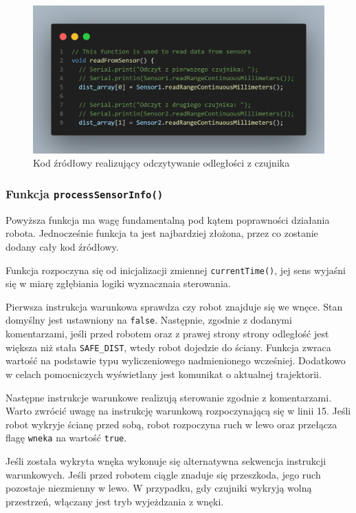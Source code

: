 \documentclass{report}
\begin{document}
\begin{figure}[H]
    \centering
    \includegraphics[width=1.0\textwidth]{src/code_snaps/readFromSensor.png}
    \caption{Kod źródłowy realizujący odczytywanie odległości z czujnika}
\end{figure}

\subsubsection*{Funkcja \texttt{processSensorInfo()}}

Powyższa funkcja ma wagę fundamentalną pod kątem poprawności działania robota. Jednocześnie funkcja ta jest najbardziej złożona, przez co zostanie dodany cały kod źródłowy. 

Funkcja rozpoczyna się od inicjalizacji zmiennej \texttt{currentTime()}, jej sens wyjaśni się w miarę zgłębiania logiki wyznacznaia sterowania. 

Pierwsza instrukcja warunkowa sprawdza czy robot znajduje się we wnęce. Stan domyślny jest ustawniony na \texttt{false}. Następnie, zgodnie z dodanymi komentarzami, jeśli przed robotem oraz z prawej strony strony odległość jest większa niż stała \texttt{SAFE\_DIST}, wtedy robot dojedzie do ściany. Funkcja zwraca wartość na podstawie typu wyliczeniowego nadmienionego wcześniej. Dodatkowo w celach pomocniczych wyświetlany jest komunikat o aktualnej trajektorii. 

Następne instrukcje warunkowe realizują sterowanie zgodnie z komentarzami. Warto zwrócić uwagę na instrukcję warunkową rozpoczynającą się w linii 15. Jeśli robot wykryje ścianę przed sobą, robot rozpoczyna ruch w lewo oraz przełącza flagę \texttt{wneka} na wartość \texttt{true}.

Jeśli została wykryta wnęka wykonuje się alternatywna sekwencja instrukcji warunkowych. Jeśli przed robotem ciągle znaduje się przeszkoda, jego ruch pozostaje niezmienny w lewo. W przypadku, gdy czujniki wykryją wolną przestrzeń, włączany jest tryb wyjeżdzania z wnęki. 
\end{document}
